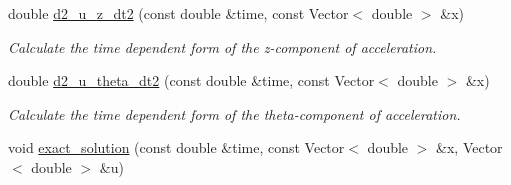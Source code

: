 \begin{DoxyCompactItemize}
double \hyperlink{namespaceGlobal__Parameters_a2167fee22e8f4d63a51a39ace1e3a743}{d2\+\_\+u\+\_\+z\+\_\+dt2} (const double \&time, const Vector$<$ double $>$ \&x)
\begin{DoxyCompactList}\small\item\em Calculate the time dependent form of the z-\/component of acceleration. \end{DoxyCompactList}\item 
double \hyperlink{namespaceGlobal__Parameters_a902b0bba2b1393518a914330f30ee4c9}{d2\+\_\+u\+\_\+theta\+\_\+dt2} (const double \&time, const Vector$<$ double $>$ \&x)
\begin{DoxyCompactList}\small\item\em Calculate the time dependent form of the theta-\/component of acceleration. \end{DoxyCompactList}\item 
void \hyperlink{namespaceGlobal__Parameters_a7da914d64b7a62d35793172f6a0fd712}{exact\+\_\+solution} (const double \&time, const Vector$<$ double $>$ \&x, Vector$<$ double $>$ \&u)
\end{DoxyCompactItemize}
